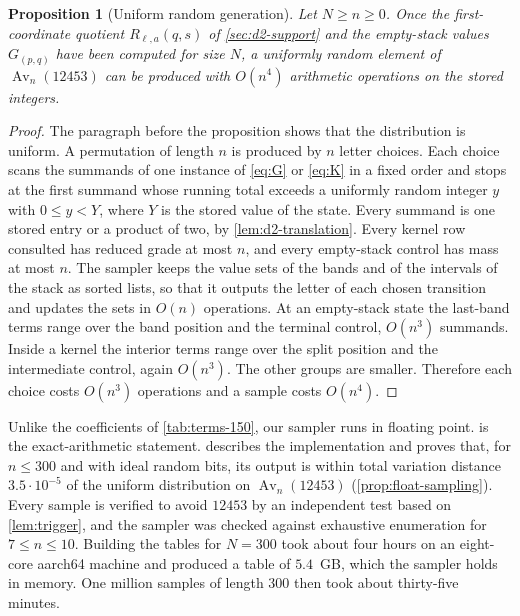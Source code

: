 \documentclass[11pt,reqno]{amsart}
\newtheorem{proposition}[proposition]{Proposition}
\theoremstyle{definition}
\theoremstyle{remark}
\newcommand{\Av}{\operatorname{Av}}
\begin{document}
\begin{proposition}[Uniform random generation]\label{prop:sampling}
Let $N\geq n\geq0$.  Once the first-coordinate quotient $R_{\ell,a}(q,s)$ of
\cref{sec:d2-support} and the empty-stack values $G_{(p,q)}$ have been
computed for size $N$, a uniformly random element of $\Av_n(12453)$ can be
produced with $O(n^4)$ arithmetic operations on the stored integers.
\end{proposition}

\begin{proof}
The paragraph before the proposition shows that the distribution is uniform.  A permutation of length $n$ is
produced by $n$ letter choices.  Each choice scans the summands of one
instance of \eqref{eq:G} or \eqref{eq:K} in a fixed order and stops at the first summand whose running
total exceeds a uniformly random integer $y$ with $0\leq y<Y$, where $Y$ is
the stored value of the state.  Every summand is one stored entry or a
product of two, by \cref{lem:d2-translation}.  Every kernel row consulted
has reduced grade at most $n$, and every empty-stack control has mass at
most $n$.  The sampler keeps the value sets of the bands and of the
intervals of the stack as sorted lists, so that it outputs the letter of
each chosen transition and updates the sets in $O(n)$ operations.  At an empty-stack state the
last-band terms range over the band position and the terminal control,
$O(n^3)$ summands.  Inside a kernel the interior terms range over the split
position and the intermediate control, again $O(n^3)$.  The other groups are
smaller.  Therefore each choice costs $O(n^3)$ operations and a sample costs
$O(n^4)$.
\end{proof}


Unlike the coefficients of \cref{tab:terms-150}, our sampler runs in
floating point.   is the exact-arithmetic statement.
 describes the implementation and proves that, for
$n\leq300$ and with ideal random bits, its output is within total variation
distance
$3.5\cdot10^{-5}$ of the uniform distribution on $\Av_n(12453)$
(\cref{prop:float-sampling}).  Every sample is verified to avoid $12453$ by
an independent test based on \cref{lem:trigger}, and the sampler was checked
against exhaustive enumeration for $7\leq n\leq10$.  Building
the tables for $N=300$ took about four hours on an eight-core aarch64
machine and produced a table of $5.4$~GB, which the sampler holds in
memory.  One million
samples of length $300$ then took about thirty-five minutes.
\end{document}
